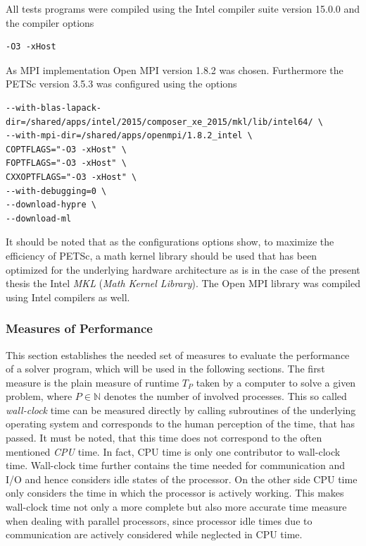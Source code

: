 All tests programs were compiled using the Intel compiler suite version 15.0.0 and the compiler options
\begin{lstlisting}
-O3 -xHost
\end{lstlisting}
As MPI implementation Open MPI version 1.8.2 was chosen. Furthermore the PETSc version 3.5.3 was configured using the options
\begin{lstlisting}
--with-blas-lapack-dir=/shared/apps/intel/2015/composer_xe_2015/mkl/lib/intel64/ \
--with-mpi-dir=/shared/apps/openmpi/1.8.2_intel \
COPTFLAGS="-O3 -xHost" \
FOPTFLAGS="-O3 -xHost" \
CXXOPTFLAGS="-O3 -xHost" \
--with-debugging=0 \
--download-hypre \
--download-ml
\end{lstlisting}
It should be noted that as the configurations options show, to maximize the efficiency of PETSc, a math kernel library should be used that has been optimized for the underlying hardware architecture as is in the case of the present thesis the Intel \emph{MKL} (\emph{Math Kernel Library}). The Open MPI library was compiled using Intel compilers as well.

\subsubsection{Measures of Performance}

This section establishes the needed set of measures to evaluate the performance of a solver program, which will be used in the following sections. The first measure is the plain measure of runtime \(T_P\) taken by a computer to solve a given problem, where \(P \in \mathbb{N}\) denotes the number of involved processes. This so called \emph{wall-clock} time can be measured directly by calling subroutines of the underlying operating system and corresponds to the human perception of the time, that has passed. It must be noted, that this time does not correspond to the often mentioned \emph{CPU} time. In fact, CPU time is only one contributor to wall-clock time. Wall-clock time further contains the time needed for communication and I/O and hence considers idle states of the processor. On the other side CPU time only considers the time in which the processor is actively working. This makes wall-clock time not only a more complete but also more accurate time measure when dealing with parallel processors, since processor idle times due to communication are actively considered while neglected in CPU time.

